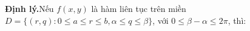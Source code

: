 \documentclass[preview]{standalone}
\begin{document}
\begin{center}
\textbf{Định lý.}Nếu $f(x, y)$ là hàm liên tục trên miền $D = \{(r, q): 0 \leq a \leq r \leq b, \alpha \leq q \leq \beta\}$, với $0 \leq \beta - \alpha \leq 2\pi$, thì:
\end{center}
\end{document}
